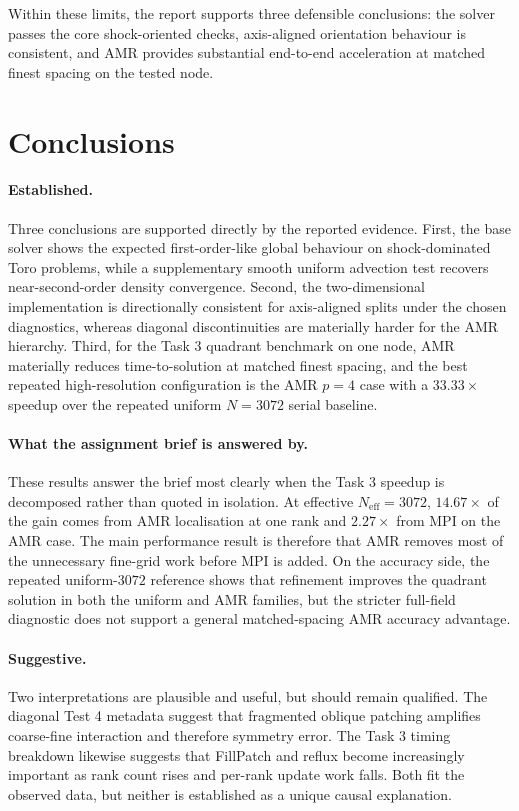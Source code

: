 \documentclass[final,3p,times,twocolumn]{elsarticle}
\begin{document}
Within these limits, the report supports three defensible conclusions: the solver passes the core shock-oriented checks, axis-aligned orientation behaviour is consistent, and AMR provides substantial end-to-end acceleration at matched finest spacing on the tested node.

\section{Conclusions}
\label{sec:conclusions}

\paragraph{Established.}
Three conclusions are supported directly by the reported evidence. First, the base solver shows the expected first-order-like global behaviour on shock-dominated Toro problems, while a supplementary smooth uniform advection test recovers near-second-order density convergence. Second, the two-dimensional implementation is directionally consistent for axis-aligned splits under the chosen diagnostics, whereas diagonal discontinuities are materially harder for the AMR hierarchy. Third, for the Task 3 quadrant benchmark on one node, AMR materially reduces time-to-solution at matched finest spacing, and the best repeated high-resolution configuration is the AMR $p=4$ case with a $33.33\times$ speedup over the repeated uniform $N=3072$ serial baseline.

\paragraph{What the assignment brief is answered by.}
These results answer the brief most clearly when the Task 3 speedup is decomposed rather than quoted in isolation. At effective $N_\mathrm{eff}=3072$, $14.67\times$ of the gain comes from AMR localisation at one rank and $2.27\times$ from MPI on the AMR case. The main performance result is therefore that AMR removes most of the unnecessary fine-grid work before MPI is added. On the accuracy side, the repeated uniform-$3072$ reference shows that refinement improves the quadrant solution in both the uniform and AMR families, but the stricter full-field diagnostic does not support a general matched-spacing AMR accuracy advantage.

\paragraph{Suggestive.}
Two interpretations are plausible and useful, but should remain qualified. The diagonal Test 4 metadata suggest that fragmented oblique patching amplifies coarse-fine interaction and therefore symmetry error. The Task 3 timing breakdown likewise suggests that FillPatch and reflux become increasingly important as rank count rises and per-rank update work falls. Both fit the observed data, but neither is established as a unique causal explanation.
\end{document}
